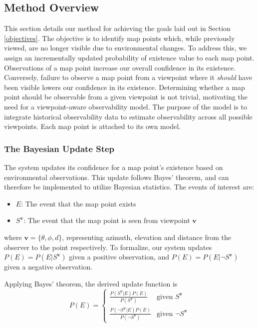 \subsection{Method Overview}

This section details our method for achieving the goals laid out in Section \ref{objectives}. The objective is to identify map points which, while previously viewed, are no longer visible due to environmental changes. To address this, we assign an incrementally updated probability of existence value to each map point. Observations of a map point increase our overall confidence in its existence. Conversely, failure to observe a map point from a viewpoint where it \textit{should} have been visible lowers our confidence in its existence. Determining whether a map point should be observable from a given viewpoint is not trivial, motivating the need for a viewpoint-aware observability model. The purpose of the model is to integrate historical observability data to estimate observability across all possible viewpoints. Each map point is attached to its own model.

\subsubsection{The Bayesian Update Step}

The system updates its confidence for a map point's existence based on environmental observations. This update follows Bayes' theorem, and can therefore be implemented to utilize Bayesian statistics. The events of interest are:
\begin{itemize}
    \item $E$: The event that the map point exists
    \item $S^{\boldsymbol{v}}$: The event that the map point is seen from viewpoint $\boldsymbol{v}$
\end{itemize}

where $\boldsymbol{v} = \{\theta,\phi,d\}$, representing azimuth, elevation and distance from the observer to the point respectively. To formalize, our system updates $P(E) = P(E|S^{\boldsymbol{v}})$ given a positive observation, and $P(E) = P(E|\neg S^{\boldsymbol{v}})$ given a negative observation.

Applying Bayes' theorem, the derived update function is
\[
    P(E) = \begin{cases}
        \frac{P(S^{\boldsymbol{v}}|E)P(E)}{P(S^{\boldsymbol{v}})}           & \text{given }S^{\boldsymbol{v}}      \\
        \frac{P(\neg S^{\boldsymbol{v}}|E)P(E)}{P(\neg S^{\boldsymbol{v}})} & \text{given }\neg S^{\boldsymbol{v}}
    \end{cases}
\]

